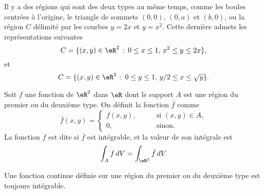 \begin{example}
 Il y a des régions qui sont des deux types au même temps, comme les boules centrées à l'origine, le triangle de sommets  $(0,0)$, $(0,a)$ et $(b,0)$, ou la région $C$ délimité par les courbes $y=2x$ et $y=x^2$. Cette dernière admets les représentations suivantes
\[
C= \{(x,y)\in\eR^2 \,:\, 0\leq x\leq 1, \, x^2\leq y\leq 2x\},
\] 
et  
\[
C= \{(x,y)\in\eR^2 \,:\, 0\leq y\leq 1, \, y/2\leq x\leq \sqrt{y}\}.
\]  
\end{example}
\begin{definition}
  Soit $f$ une fonction de $\eR^2$ dans $\eR$ dont le support  $A$ est une région du premier ou du deuxième type. On définit la fonction $\bar f$ comme
 \begin{equation}
 \bar f(x,y) = \left\{ \begin{array}{ll}
     f(x,y), \qquad & \textrm{si } (x,y)\in A,\\
  0 , & \textrm{sinon.} 
    \end{array}\right.
  \end{equation}
  La fonction $f$ est dite  si $\bar f$ est intégrable, et la valeur de son intégrale est 
\[
\int_A f\, dV=\int_{\eR^2} \bar f\, dV.
\] 
\end{definition}
Une fonction continue définie sur une région du premier ou du deuxième type est toujours intégrable. 

